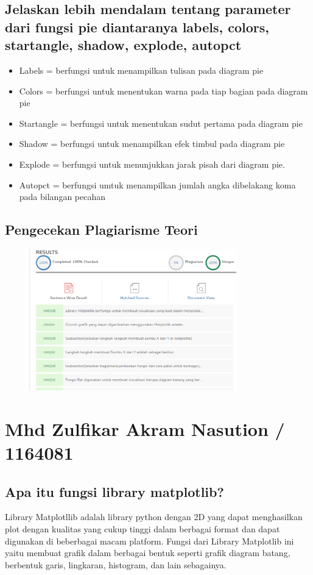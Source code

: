 \subsection{Jelaskan lebih mendalam tentang parameter dari fungsi pie diantaranya labels, colors, startangle, shadow, explode, autopct}
\begin{itemize}
    \item Labels = berfungsi untuk menampilkan tulisan pada diagram pie
    \item Colors = berfungsi untuk menentukan warna pada tiap bagian pada diagram pie
    \item Startangle = berfungsi untuk menentukan sudut pertama pada diagram pie
    \item Shadow = berfungsi untuk menampilkan efek timbul pada diagram pie
    \item Explode = berfungsi untuk menunjukkan jarak pisah dari diagram pie.
    \item Autopct = berfungsi umtuk menampilkan jumlah angka dibelakang koma pada bilangan pecahan
\end{itemize}

\subsection{Pengecekan Plagiarisme Teori}
\begin{figure}[H]
    \includegraphics[width=9cm]{figures/6/Teori/1174038/plagiat.png}
    \centering
\end{figure}

\section{Mhd Zulfikar Akram Nasution / 1164081}
\subsection{Apa itu fungsi library matplotlib?}
 Library Matplotllib adalah library python dengan 2D yang dapat menghasilkan plot dengan kualitas yang cukup tinggi dalam berbagai format dan dapat digunakan di beberbagai macam platform. Fungsi dari Library Matplotlib ini yaitu membuat grafik dalam berbagai bentuk seperti grafik diagram batang, berbentuk garis, lingkaran, histogram, dan lain sebagainya.
